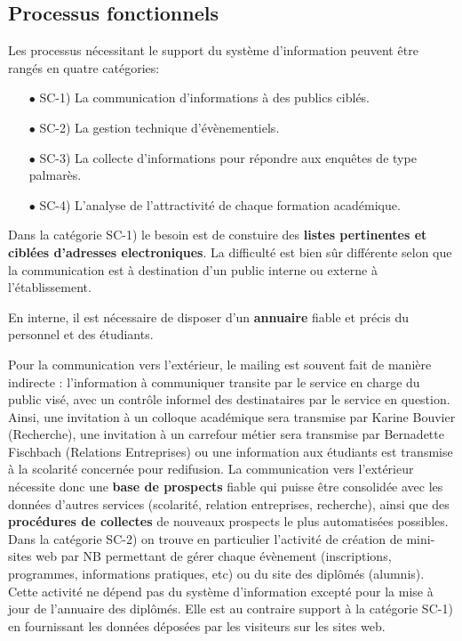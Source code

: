 \documentclass{book}
\begin{document}
\subsection{Processus fonctionnels}
Les processus nécessitant le support du système d'information peuvent 
être rangés en quatre catégories:
\begin{itemize}
\item[$\bullet$] SC-1) La communication d'informations à des publics ciblés.
\item[$\bullet$] SC-2) La gestion technique d'évènementiels.
\item[$\bullet$] SC-3) La collecte d'informations pour répondre aux enquêtes de type 
      palmarès.
\item[$\bullet$] SC-4) L'analyse de l'attractivité de chaque formation académique.
\end{itemize}
\bigskip

Dans la catégorie SC-1) le besoin est de constuire des \textbf{listes 
pertinentes et ciblées d'adresses electroniques}. La difficulté
est bien sûr différente selon que la communication est à destination
d'un public interne ou externe à l'établissement.

En interne, il est nécessaire de disposer d'un \textbf{annuaire}
fiable et précis du personnel et des étudiants. 

Pour la communication vers l'extérieur, le mailing est souvent 
fait de manière indirecte : l'information à communiquer transite par
le service en charge du public visé, avec un contrôle informel des 
destinataires par le service en question. Ainsi, une invitation à un 
colloque académique sera transmise par Karine Bouvier (Recherche),
une invitation à un carrefour métier sera transmise par Bernadette 
Fischbach (Relations Entreprises) ou une information aux étudiants
est transmise à la scolarité concernée pour redifusion. La communication 
vers l'extérieur nécessite donc une \textbf{base de prospects} fiable 
qui puisse être consolidée avec les données d'autres services (scolarité, 
relation entreprises, recherche), ainsi que des \textbf{procédures 
de collectes} de nouveaux prospects le plus automatisées possibles.\\

Dans la catégorie SC-2) on trouve en particulier l'activité de création
de mini-sites web par NB permettant de gérer chaque évènement (inscriptions,
programmes, informations pratiques, etc) ou du site des diplômés (alumnis).
Cette activité ne dépend pas du système d'information excepté pour
la mise à jour de l'annuaire des diplômés. Elle est au contraire 
support à la catégorie SC-1) en fournissant les données déposées par les
visiteurs sur les sites web.\\ 
\end{document}
